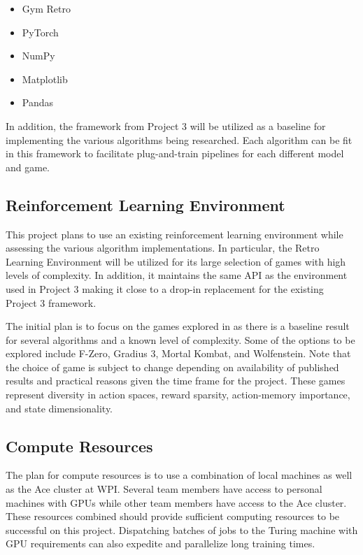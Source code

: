 \documentclass[conference]{IEEEtran}
\begin{document}
\begin{itemize}
    \item Gym Retro \cite{nichol2018retro}
    \item PyTorch
    \item NumPy
    \item Matplotlib
    \item Pandas
\end{itemize}

In addition, the framework from Project 3 will be utilized as a baseline for implementing the various algorithms being researched. Each algorithm can be fit in this framework to facilitate plug-and-train pipelines for each different model and game.

\subsection{Reinforcement Learning Environment}
This project plans to use an existing reinforcement learning environment while assessing the various algorithm implementations.
In particular, the Retro Learning Environment \cite{nichol2018retro} will be utilized for its large selection of games with high levels of complexity.
In addition, it maintains the same API as the environment used in Project 3 making it close to a drop-in replacement for the existing Project 3 framework.

The initial plan is to focus on the games explored in \cite{bhonker2017playing} as there is a baseline result for several algorithms and a known level of complexity.
Some of the options to be explored include F-Zero, Gradius 3, Mortal Kombat, and Wolfenstein.
Note that the choice of game is subject to change depending on availability of published results and practical reasons given the time frame for the project.
These games represent diversity in action spaces, reward sparsity, action-memory importance, and state dimensionality.

\subsection{Compute Resources}
The plan for compute resources is to use a combination of local machines as well as the Ace cluster at WPI.
Several team members have access to personal machines with GPUs while other team members have access to the Ace cluster.
These resources combined should provide sufficient computing resources to be successful on this project.
Dispatching batches of jobs to the Turing machine with GPU requirements can also expedite and parallelize long training times.
\end{document}
